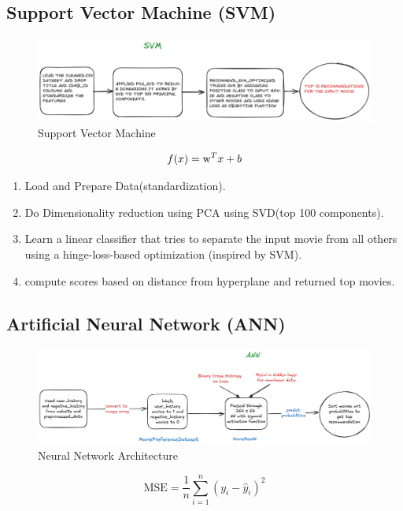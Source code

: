 \documentclass[a4paper]{article}
\theoremstyle{plain}
\begin{document}
\subsection{Support Vector Machine (SVM)}
\begin{figure}[H]
    \centering
    \includegraphics[width=\linewidth]{svm.png}
    \caption{Support Vector Machine}
    \label{fig:svm}
\end{figure}

\[
f(x) = \text w^T x + b
\]

\begin{enumerate}
    \item Load and Prepare Data(standardization).
    \item Do Dimensionality reduction using PCA using SVD(top 100 components).
    \item Learn a linear classifier that tries to separate the input movie from all others using a hinge-loss-based optimization (inspired by SVM).
    \item compute scores based on distance from hyperplane and returned  top movies.
\end{enumerate}

\subsection{Artificial Neural Network (ANN)}
\begin{figure}[H]
    \centering
    \includegraphics[width=\linewidth]{ann.png}
    \caption{Neural Network Architecture}
    \label{fig:ann}
\end{figure}

\[
\text{MSE} = \frac{1}{n} \sum_{i=1}^{n}(y_i - \hat{y}_i)^2
\]
\end{document}
